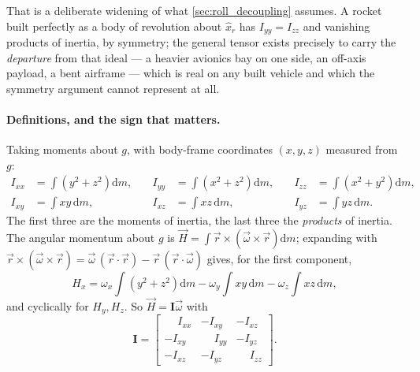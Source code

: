 That is a deliberate widening of what \autoref{sec:roll_decoupling} assumes. A rocket built
perfectly as a body of revolution about $\hat{x}_r$ has $I_{yy}=I_{zz}$ and vanishing products of
inertia, by symmetry; the general tensor exists precisely to carry the \emph{departure} from that
ideal --- a heavier avionics bay on one side, an off-axis payload, a bent airframe --- which is
real on any built vehicle and which the symmetry argument cannot represent at all.

\paragraph{Definitions, and the sign that matters.} Taking moments about $g$, with body-frame
coordinates $(x,y,z)$ measured from $g$:
\begin{equation} \label{eq:inertia_integrals}
    \begin{aligned}
        I_{xx} &= \int\left(y^2+z^2\right)\mathrm{d}m, &\quad
        I_{yy} &= \int\left(x^2+z^2\right)\mathrm{d}m, &\quad
        I_{zz} &= \int\left(x^2+y^2\right)\mathrm{d}m, \\
        I_{xy} &= \int xy\,\mathrm{d}m, &\quad
        I_{xz} &= \int xz\,\mathrm{d}m, &\quad
        I_{yz} &= \int yz\,\mathrm{d}m.
    \end{aligned}
\end{equation}
The first three are the moments of inertia, the last three the \emph{products} of inertia. The
angular momentum about $g$ is $\vec{H} = \int \vec{r}\times\left(\vec\omega\times\vec{r}\right)
\mathrm{d}m$; expanding with $\vec{r}\times(\vec\omega\times\vec{r}) = \vec\omega\,(\vec{r}\cdot
\vec{r}) - \vec{r}\,(\vec{r}\cdot\vec\omega)$ gives, for the first component,
\begin{equation*}
    H_x = \omega_x\!\int\!\left(y^2+z^2\right)\mathrm{d}m - \omega_y\!\int\! xy\,\mathrm{d}m
          - \omega_z\!\int\! xz\,\mathrm{d}m,
\end{equation*}
and cyclically for $H_y,H_z$. So $\vec{H}=\mathbf{I}\vec\omega$ with
\begin{equation} \label{eq:inertia_matrix}
    \mathbf{I} = \begin{bmatrix}
        \phantom{-}I_{xx} & -I_{xy} & -I_{xz} \\
        -I_{xy} & \phantom{-}I_{yy} & -I_{yz} \\
        -I_{xz} & -I_{yz} & \phantom{-}I_{zz}
    \end{bmatrix}.
\end{equation}
